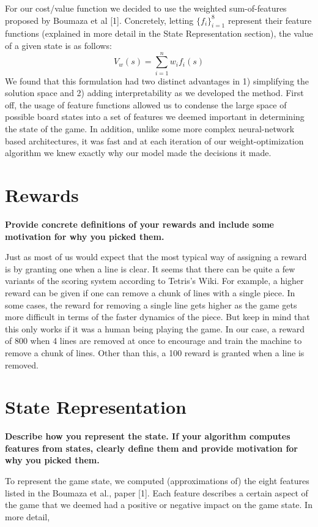 \documentclass[12pt,letterpaper]{article}
\begin{document}
For our cost/value function we decided to use the weighted sum-of-features proposed by Boumaza et al [1]. Concretely, letting $\{f_i\}_{i=1}^{8}$ represent their feature functions (explained in more detail in the State Representation section), the value of a given state is as follows: $$V_w(s) = \sum_{i=1}^nw_if_i(s)$$
We found that this formulation had two distinct advantages in 1) simplifying the solution space and 2) adding interpretability as we developed the method. First off, the usage of feature functions allowed us to condense the large space of possible board states into a set of features we deemed important in determining the state of the game. In addition, unlike some more complex neural-network based architectures, it was fast and at each iteration of our weight-optimization algorithm we knew exactly why our model made the decisions it made.

\section{Rewards}
\textbf{Provide concrete definitions of your rewards and include some motivation for why you picked them.}

Just as most of us would expect that the most typical way of assigning a reward is by granting one when a line is clear. It seems that there can be quite a few variants of the scoring system according to Tetris's Wiki. For example, a higher reward can be given if one can remove a chunk of lines with a single piece. In some cases, the reward for removing a single line gets higher as the game gets more difficult in terms of the faster dynamics of the piece. But keep in mind that this only works if it was a human being playing the game. In our case, a reward of 800 when 4 lines are removed at once to encourage and train the machine to remove a chunk of lines. Other than this, a 100 reward is granted when a line is removed.

\section{State Representation}
\textbf{Describe how you represent the state. If your algorithm computes features from states, clearly define them and provide motivation for why you picked them.}

To represent the game state, we computed (approximations of) the eight features listed in the Boumaza et al., paper [1]. Each feature describes a certain aspect of the game that we deemed had a positive or negative impact on the game state. In more detail,
\end{document}
